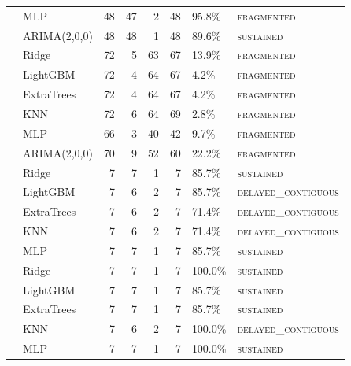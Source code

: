 \documentclass[pdflatex,sn-mathphys]{sn-jnl}
\begin{document}
\begin{table}[ht]
\begin{tabularx}{\textwidth}{llrrrrlX}
  & MLP          & 48 & 47 &  2 & 48 &  95.8\% & \textsc{fragmented} \\
  & ARIMA(2,0,0) & 48 & 48 &  1 & 48 &  89.6\% & \textsc{sustained} \\
\midrule
{}
  & Ridge        & 72 &  5 & 63 & 67 &  13.9\% & \textsc{fragmented} \\
  & LightGBM     & 72 &  4 & 64 & 67 &   4.2\% & \textsc{fragmented} \\
  & ExtraTrees   & 72 &  4 & 64 & 67 &   4.2\% & \textsc{fragmented} \\
  & KNN          & 72 &  6 & 64 & 69 &   2.8\% & \textsc{fragmented} \\
  & MLP          & 66 &  3 & 40 & 42 &   9.7\% & \textsc{fragmented} \\
  & ARIMA(2,0,0) & 70 &  9 & 52 & 60 &  22.2\% & \textsc{fragmented} \\
\midrule
{}
  & Ridge      & 7 & 7 & 1 & 7 &  85.7\% & \textsc{sustained} \\
  & LightGBM   & 7 & 6 & 2 & 7 &  85.7\% & \textsc{delayed\_contiguous} \\
  & ExtraTrees & 7 & 6 & 2 & 7 &  71.4\% & \textsc{delayed\_contiguous} \\
  & KNN        & 7 & 6 & 2 & 7 &  71.4\% & \textsc{delayed\_contiguous} \\
  & MLP        & 7 & 7 & 1 & 7 &  85.7\% & \textsc{sustained} \\
\midrule
{}
  & Ridge      & 7 & 7 & 1 & 7 & 100.0\% & \textsc{sustained} \\
  & LightGBM   & 7 & 7 & 1 & 7 &  85.7\% & \textsc{sustained} \\
  & ExtraTrees & 7 & 7 & 1 & 7 &  85.7\% & \textsc{sustained} \\
  & KNN        & 7 & 6 & 2 & 7 & 100.0\% & \textsc{delayed\_contiguous} \\
  & MLP        & 7 & 7 & 1 & 7 & 100.0\% & \textsc{sustained} \\
\bottomrule
\end{tabularx}
\end{table}

\end{document}
